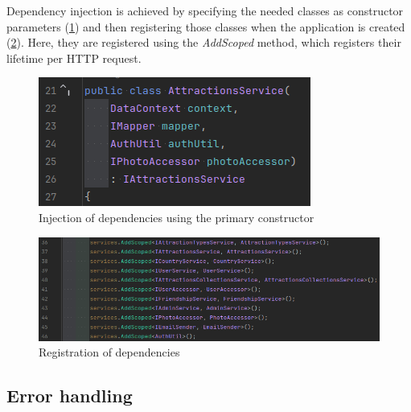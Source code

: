 \par Dependency injection is achieved by specifying the needed classes as constructor parameters (\ref{fig:dependency-injection_usage}) and then registering those classes when the application is created (\ref{fig:dependency-injection_registering}). Here, they are registered using the \textit{AddScoped} method, which registers their lifetime per HTTP request.


\begin{figure}[!ht]
    \centering
    \includegraphics[width=0.5\linewidth]{dependency-injection_usage.png}
    \caption{Injection of dependencies using the primary constructor}
    \label{fig:dependency-injection_usage}
\end{figure}

\begin{figure}
    \centering
    \includegraphics[width=1\linewidth]{dependency-injection_registering.png}
    \caption{Registration of dependencies}
    \label{fig:dependency-injection_registering}
\end{figure}

\subsection{Error handling}

